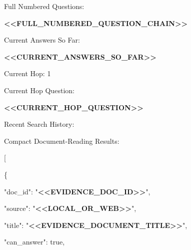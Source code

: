 \begin{tcolorbox}
\begin{scriptsize}
\mbox{}\par
Full Numbered Questions:\par
\textcolor{my-green}{\textbf{\textless{}\textless{}FULL\_NUMBERED\_QUESTION\_CHAIN\textgreater{}\textgreater{}}}\par
\mbox{}\par
Current Answers So Far:\par
\textcolor{my-green}{\textbf{\textless{}\textless{}CURRENT\_ANSWERS\_SO\_FAR\textgreater{}\textgreater{}}}\par
\mbox{}\par
Current Hop: 1\par
Current Hop Question:\par
\textcolor{my-green}{\textbf{\textless{}\textless{}CURRENT\_HOP\_QUESTION\textgreater{}\textgreater{}}}\par
\mbox{}\par
Recent Search History:\par
[\par
  \{\par
    "iteration": "\textcolor{my-green}{\textbf{\textless{}\textless{}ITERATION\_INDEX\textgreater{}\textgreater{}}}",\par
    "type": "\textcolor{my-green}{\textbf{\textless{}\textless{}RETRIEVAL\_ACTION\_TYPE\textgreater{}\textgreater{}}}",\par
    "query": "\textcolor{my-green}{\textbf{\textless{}\textless{}VISIBLE\_OR\_LOCAL\_RETRIEVAL\_QUERY\textgreater{}\textgreater{}}}",\par
    "result\_count": "\textcolor{my-green}{\textbf{\textless{}\textless{}N\_RESULTS\textgreater{}\textgreater{}}}"\par
  \}\par
]\par
\mbox{}\par
Compact Document-Reading Results:\par
[\par
  \{\par
    "doc\_id": "\textcolor{my-green}{\textbf{\textless{}\textless{}EVIDENCE\_DOC\_ID\textgreater{}\textgreater{}}}",\par
    "source": "\textcolor{my-green}{\textbf{\textless{}\textless{}LOCAL\_OR\_WEB\textgreater{}\textgreater{}}}",\par
    "title": "\textcolor{my-green}{\textbf{\textless{}\textless{}EVIDENCE\_DOCUMENT\_TITLE\textgreater{}\textgreater{}}}",\par
    "can\_answer": true,\par

\end{scriptsize}
\end{tcolorbox}
